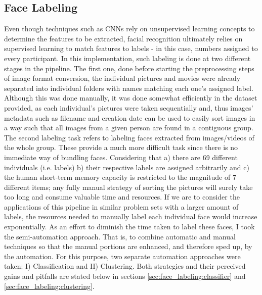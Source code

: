 \documentclass[11pt]{article}
\begin{document}
\subsection{Face Labeling}\label{sec:face_labeling}
    Even though techniques such as CNNs rely on unsupervised learning concepts to determine the features to be extracted, facial recognition ultimately relies on supervised learning to match features to labels - in this case, numbers assigned to every participant. In this implementation, such labeling is done at two different stages in the pipeline. The first one, done before starting the preprocessing steps of image format conversion, the individual pictures and movies were already separated into individual folders with names matching each one's assigned label. Although this was done manually, it was done somewhat efficiently in the dataset provided, as each individual's pictures were taken sequentially and, thus images' metadata such as filename and creation date can be used to easily sort images in a way such that all images from a given person are found in a contiguous group. The second labeling task refers to labeling faces extracted from images/videos of the whole group. These provide a much more difficult task since there is no immediate way of bundling faces. Considering that a) there are 69 different individuals (i.e. labels) b) their respective labels are assigned arbitrarily and c) the human short-term memory capacity is restricted to the magnitude of 7 different items; any fully manual strategy of sorting the pictures will surely take too long and consume valuable time and resources. If we are to consider the applications of this pipeline in similar problem sets with a larger amount of labels, the resources needed to manually label each individual face would increase exponentially. As an effort to diminish the time taken to label these faces, I took the semi-automation approach. That is, to combine automatic and manual techniques so that the manual portions are enhanced, and therefore sped up, by the automation. For this purpose, two separate automation approaches were taken: I) Classification and II) Clustering. Both strategies and their perceived gains and pitfalls are stated below in sections \ref{sec:face_labeling:classifier} and \ref{sec:face_labeling:clustering}.
\end{document}
